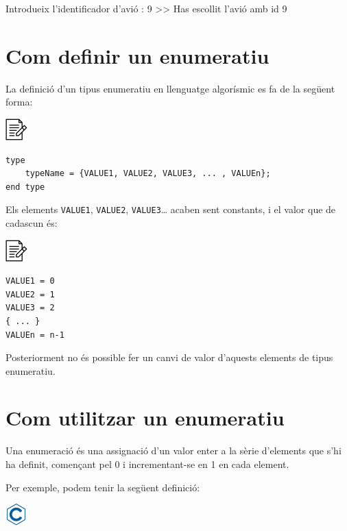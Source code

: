 \documentclass[]{book}
\newenvironment{Shaded}{\begin{snugshade}}{\end{snugshade}}
\newcommand{\DecValTok}[1]{\textcolor[rgb]{0.00,0.00,0.81}{#1}}
\newcommand{\NormalTok}[1]{#1}
\begin{document}
\begin{Shaded}
\begin{Highlighting}[]
\NormalTok{Introdueix l'identificador d'avió : }\DecValTok{9}
\NormalTok{>> Has escollit l'avió amb id }\DecValTok{9} 
\end{Highlighting}
\end{Shaded}

\section{Com definir un enumeratiu}\label{com-definir-un-enumeratiu}

La definició d'un tipus enumeratiu en llenguatge algorísmic es fa de la
següent forma:

\includegraphics{./img/alg.png}

\begin{verbatim}
type
    typeName = {VALUE1, VALUE2, VALUE3, ... , VALUEn};
end type
\end{verbatim}

Els elements \texttt{VALUE1}, \texttt{VALUE2}, \texttt{VALUE3}\ldots{}
acaben sent constants, i el valor que de cadascun és:

\includegraphics{./img/alg.png}

\begin{verbatim}
VALUE1 = 0
VALUE2 = 1
VALUE3 = 2 
{ ... }
VALUEn = n-1
\end{verbatim}

Posteriorment no és possible fer un canvi de valor d'aquests elements de
tipus enumeratiu.

\section{Com utilitzar un enumeratiu}\label{com-utilitzar-un-enumeratiu}

Una enumeració és una assignació d'un valor enter a la sèrie d'elements
que s'hi ha definit, començant pel 0 i incrementant-se en 1 en cada
element.

Per exemple, podem tenir la següent definició:

\includegraphics{./img/c.png}
\end{document}
